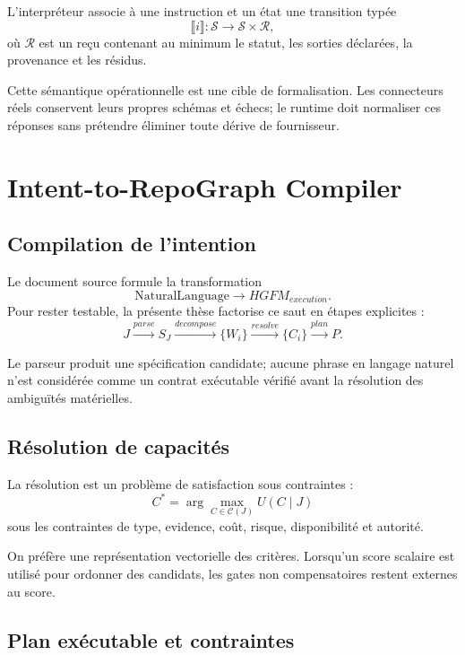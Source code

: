 L'interpréteur associe à une instruction et un état une transition typée
\[
\llbracket i\rrbracket:\mathcal S\to \mathcal S\times\mathcal R,
\]
où $\mathcal R$ est un reçu contenant au minimum le statut, les sorties déclarées, la provenance et les résidus.

\begin{limitation}
Cette sémantique opérationnelle est une cible de formalisation. Les connecteurs réels conservent leurs propres schémas et échecs; le runtime doit normaliser ces réponses sans prétendre éliminer toute dérive de fournisseur.
\end{limitation}

\chapter{Intent-to-RepoGraph Compiler}

\section{Compilation de l'intention}

Le document source formule la transformation
\[
\mathrm{NaturalLanguage}\rightarrow HGFM_{execution}.
\]
Pour rester testable, la présente thèse factorise ce saut en étapes explicites :
\[
J\xrightarrow{parse}S_J\xrightarrow{decompose}\{W_i\}\xrightarrow{resolve}\{C_i\}\xrightarrow{plan}P.
\]

Le parseur produit une spécification candidate; aucune phrase en langage naturel n'est considérée comme un contrat exécutable vérifié avant la résolution des ambiguïtés matérielles.

\section{Résolution de capacités}

La résolution est un problème de satisfaction sous contraintes :
\[
C^*=\arg\max_{C\in\mathcal C(J)} U(C\mid J)
\]
sous les contraintes de type, evidence, coût, risque, disponibilité et autorité.

On préfère une représentation vectorielle des critères. Lorsqu'un score scalaire est utilisé pour ordonner des candidats, les gates non compensatoires restent externes au score.

\section{Plan exécutable et contraintes}

